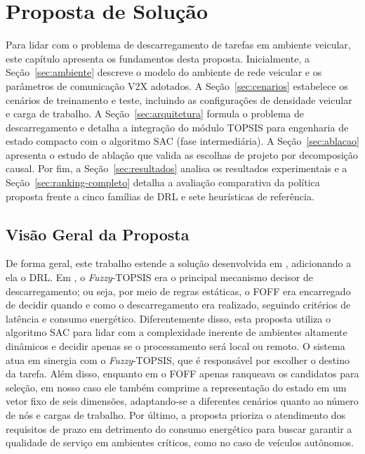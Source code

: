 \chapter{Proposta de Solução} \label{chap:proposta}

Para lidar com o problema de descarregamento de tarefas em ambiente veicular, este capítulo apresenta os fundamentos desta proposta. Inicialmente, a Seção~\ref{sec:ambiente} descreve o modelo do ambiente de rede veicular e os parâmetros de comunicação \gls{V2X} adotados. A Seção~\ref{sec:cenarios} estabelece os cenários de treinamento e teste, incluindo as configurações de densidade veicular e carga de trabalho. A Seção~\ref{sec:arquitetura} formula o problema de descarregamento e detalha a integração do módulo \gls{TOPSIS} para engenharia de estado compacto com o algoritmo \gls{SAC} (fase intermediária). A Seção~\ref{sec:ablacao} apresenta o estudo de ablação que valida as escolhas de projeto por decomposição causal. Por fim, a Seção~\ref{sec:resultados} analisa os resultados experimentais e a Seção~\ref{sec:ranking-completo} detalha a avaliação comparativa da política proposta frente a cinco famílias de \gls{DRL} e sete heurísticas de referência.

\section*{Visão Geral da Proposta}

 De forma geral, este trabalho estende a solução desenvolvida em \cite{vieira2025}, adicionando a ela o \gls{DRL}. Em \cite{vieira2025}, o \textit{Fuzzy}-\gls{TOPSIS} era o principal mecanismo decisor de descarregamento; ou seja, por meio de regras estáticas, o \gls{FOFF} era encarregado de decidir quando e como o descarregamento era realizado, seguindo critérios de latência e consumo energético. Diferentemente disso, esta proposta utiliza o algoritmo \gls{SAC} para lidar com a complexidade inerente de ambientes altamente dinâmicos e decidir apenas se o processamento será local ou remoto. O sistema atua em sinergia com o \textit{Fuzzy}-\gls{TOPSIS}, que é responsável por escolher o destino da tarefa. Além disso, enquanto em \cite{vieira2025} o \gls{FOFF} apenas ranqueava os candidatos para seleção, em nosso caso ele também comprime a representação do estado em um vetor fixo de seis dimensões, adaptando-se a diferentes cenários quanto ao número de nós e cargas de trabalho. Por último, a proposta prioriza o atendimento dos requisitos de prazo em detrimento do consumo energético para buscar garantir a qualidade de serviço em ambientes críticos, como no caso de veículos autônomos.

